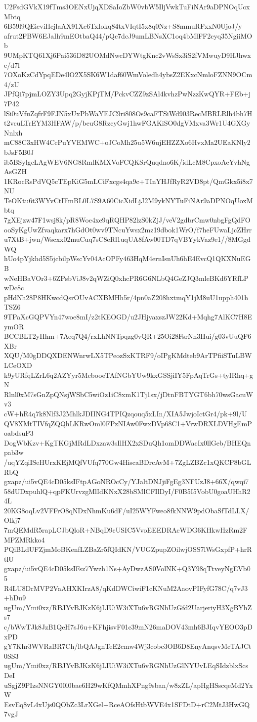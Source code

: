 U2FsdGVkX19fTms3OENxUjqXDSaIoZbW0vbW5IljVwkTuFiNAr9aDPNOqUoxMbtq
6B59l9QEieviHcjlaAX91Xe6TxIokq84txVIqtI5x8q0Nz+S8mmuRFxxN0UjoJ/y
afrut2FBW6EJaIh9mEOtbaQ44/pQc7dcJ9umLBNsXC1oq4bMlFF2cyq35NgiiMOb
9UMpKTQ61Xj6Pai536D82UOMdNwcDYWtgKnc2vWsSx3iS2fVMwuyD9HJhwxe/d7l
7OXoKzCdYpqEDe4lO2X5SK6W1daf60WmVoledh4ybsZ2EKxcNmloFZNN9OCm4/zU
JPfQi7pjmLOZY3Upq2GyjKPjTM/PckvCZZ9zSAl4kvhzPwNzzKwQYR+FEb+j7P42
lSi0uVfuZqfrF9FJN5xUxPbWaYEJC9ri808Os9caFTSiWd903RecMBRLRlh4bh7H
t2vcuLTrEYM3HFAW/p/beuG8RzcyGwj1hwFGAKiSO0dgVMxva3Wr1U4GXGyNnlxh
mC88C3xHW4CcPuYVEMWC+oJCoMh25u5W6ujEHZZXo6HvxMa2UEaKNly2bJsF5B0J
ib5BSylgcLAgWEV6NG8RmlKMXVoFCQKSrQuqdno6K/idLcM8CpxoAeYvhNgAsGZH
1KRocRsPdVQ5cTEpKiG5mLCiFxcgs4qa9c+TInYHJfRyR2VD8pt/QmGkx5i8x7NU
TeOKtu6t3WYvCtIFmBL0L7S9A60CicXidLjJ2M9ykNYTuFiNAr9aDPNOqUoxMbtq
7gXEjzw47F1wsj8k/pR8Woe4xe9qRQHP82lzS0kZjJ/veV2gdbrCmw0nbgFgQdFO
ooSyKgUwZfvaqkarx7hGdOt0wv9TNcuYwsx2mz19dbok1WrO/f7heFUwaLjcZHrr
u7XtB+jwn/Wscxx02muCuq7sC8eRl1uqUA8fAw00TD7qVBYykVaz9e1//8MGgdWQ
hUo4pYjkhd5S5jcbilpWscYv04AcOPFy463HqM4ernIsnUh6hE4EvcQ1QKXNuEGB
wNeHBaVOr3+6ZPsbViJ8v2qWZiQ0xhcPR6G6NLbQ4GeZJQ3mleBKd6YRfLPwDc8c
pHdNh28P8HKwcdQsrOUvACXBMHh5r/4pn0aZ208hxtmqY1jM8uU1upph401hTSZ6
9TPaXcGQPVYn47woe8mI/z2tKEOGD/u2JHjyaxszJW22Kd+Mqhg7AlKC7H8EymOR
BCCBLT2yHhm+7Aeq7Q4/rxLhNNTpqzg0vQR+25Oi28FsrNn3Hui/g03vUuQF6XBr
XQU/M0gDDQXDENWnrwLX5TPeozSxKTRF9/oIPgKMdteb9ArTPfiiSTuLBWLCeOXD
k9yURfqLZrL6q2AZYyr5McbooeTAfNGbYUw9kxGSSjiIY5FpAqTrGs+tyIRhq+gN
Rlnl0xM7sGnZpQNsjWSbC5wiOz1iC8xmK1Tj1sx/jDtnFBTYGT6bh70wsGacuWv3
cW+hR4q7k8Nlf3J2MhlkJDIING4TPIQzqouq5xLIn/XIA5JwjoIctGr4/pk+9l/U
QV8XMtTIVfqZQQhLKRwOml0FPzNIAw0FwxDVp68C1+VrwDRXLDVHgEmPoabdsuP3
DogWbKzv+KgTKGjMRdLDxzaw3sIlHX2xSDuQh1omDDWacIx0llGeb/BHEQnpab3w
/uqYZqiISeHUrxKEjMQfVUfq770Gw4HiscaBDrcAvM+7ZgLZBZc1xQKCP8bGLRbQ
gxapz/ui5vQE4cD05ksIFtpAGoNROcCy/YJaltDNJjiFgEg3NFUzJ8+66X/qwqi7
58dUDxpuhlQ+qpFKUrvzgMlIdKNxX28bSMlCFIlDyI/F0B5I5VobU0goaUHhR24L
20KG8oqLv2VFFrO8qNDxNhmKu6dF/uI25WYFweo8fkNNW9pdObaSfTdLLX/Olkj7
7mQEMdR5rapLCJbQloR+NBqD9cUSIC5VvoEEEDRAcWDG6KHkwHzRm2FMPZMRkko4
PQiBLdUFZjmMoBKenfLZBaZr5fQIdKN/VUGZpupZOilwjOSS7lWsGxpfP+hrRtlU
gxapz/ui5vQE4cD05ksIFsz7Ywzh1Ns+AyDwzAS0VolNK+Q3Y98qTtveyNgEVb05
R4LU8DrMVP2VaAHXKIrzA8/qKdDWCiwiF1cKNuM2AaovPIFyfG78C/q7vJ3+hDu9
ugUm/Ymi0xz/RBJYvBJKzK6jLIUiW3iXTu6vRGNhUzGfd2UarjeriyH3XgBYhZs7
c/bWwTJk8JzB1QeH7sJ6u+KFhjisvF01c39mN26maDOV43mh6BJIqvYEOO3pDxPD
gY7Khr3WVRzBR7Ch/lbQAJgnTeE2cmw4Wj3cobc3OB6D8EnyAnqsvMcTAJCt0SS3
ugUm/Ymi0xz/RBJYvBJKzK6jLIUiW3iXTu6vRGNhUzGlNYUvLEqSIdzblxScsDeI
uSgjZ9PIzsNNGY00l0bae6H29wKfQMmhXPng9sban/w8xZL/apHgHSscqeMd2YxW
EsvEq8vL4xUjs0QObZc3LrXGel+RceAOfsHtbWVE4x1SFDtD+rC2MtJ3HwGQ7vgJ
